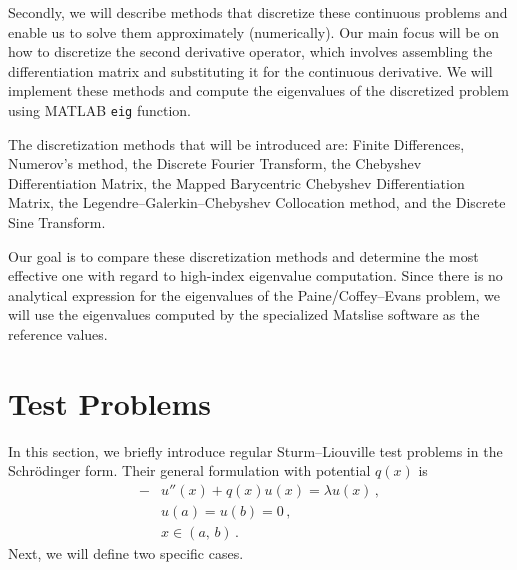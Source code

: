 \documentclass[11pt,a4paper,oneside,openright]{report} %
\begin{document}
Secondly, we will describe methods that discretize these continuous problems and enable us to solve them approximately (numerically). Our main focus will be on how to discretize the second derivative operator, which involves assembling the differentiation matrix and substituting it for the continuous derivative. We will implement these methods and compute the eigenvalues of the discretized problem using MATLAB \texttt{eig} function.

The discretization methods that will be introduced are: Finite Differences, Numerov's method, the Discrete Fourier Transform, the Chebyshev Differentiation Matrix, the Mapped Barycentric Chebyshev Differentiation Matrix, the Legendre--Galerkin--Chebyshev Collocation method, and the Discrete Sine Transform. 

Our goal is to compare these discretization methods and determine the most effective one with regard to high-index eigenvalue computation. Since there is no analytical expression for the eigenvalues of the Paine/Coffey--Evans problem, we will use the eigenvalues computed by the specialized Matslise software as the reference values.

\section{Test Problems}
\noindent
In this section, we briefly introduce regular Sturm--Liouville test problems in the Schrödinger form. Their general formulation with potential $q(x)$ is
\begin{subequations}\label{eq_general_test_problem}
    \begin{align}
    - & u''(x) + q(x) u(x) = \lambda u(x) \, , \label{eq_general_SLP_1} \\[5pt]
    & u(a) = u(b) = 0 \, , \\[5pt]
    & x \in (a, \, b) \, .
    \end{align}
\end{subequations}
Next, we will define two specific cases.
\end{document}
